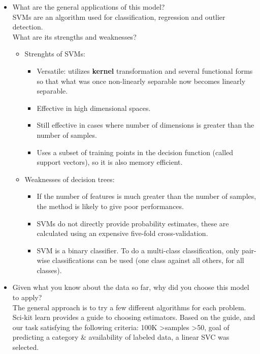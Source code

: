 \documentclass[12pt]{article}
\begin{document}
\begin{itemize}
\item What are the general applications of this model?\\ 
SVMs are an algorithm used for classification, regression and outlier detection.\\
What are its strengths and weaknesses?
\begin{itemize}
       \item Strenghts of SVMs:
              \begin{itemize}[noitemsep,nolistsep]
                     \item Versatile: utilizes \textbf{kernel} transformation and several functional forms so that what was once non-linearly separable now becomes linearly separable.
                     \item Effective in high dimensional spaces.
                     \item Still effective in cases where number of dimensions is greater than the number of samples.
                     \item Uses a subset of training points in the decision function (called support vectors), so it is also memory efficient.
              \end{itemize}
       \item Weaknesses of decision trees:
              \begin{itemize}[noitemsep,nolistsep]
                     \item If the number of features is much greater than the number of samples, the method is likely to give poor performances.
                     \item SVMs do not directly provide probability estimates, these are calculated using an expensive five-fold cross-validation.
                     \item SVM is a binary classifier. To do a multi-class classification, only pair-wise classifications can be used (one class against all others, for all classes).
              \end{itemize}
       \end{itemize}

\item Given what you know about the data so far, why did you choose this model to apply?\\
The general approach is to try a few different algorithms for each problem. Sci-kit learn provides a guide to choosing estimators. Based on the guide, and our task satisfying the following criteria: {100K \textgreater samples \textgreater 50, goal of predicting a category \& availability of labeled data}, a linear SVC was selected. 
\end{itemize}
\end{document}
